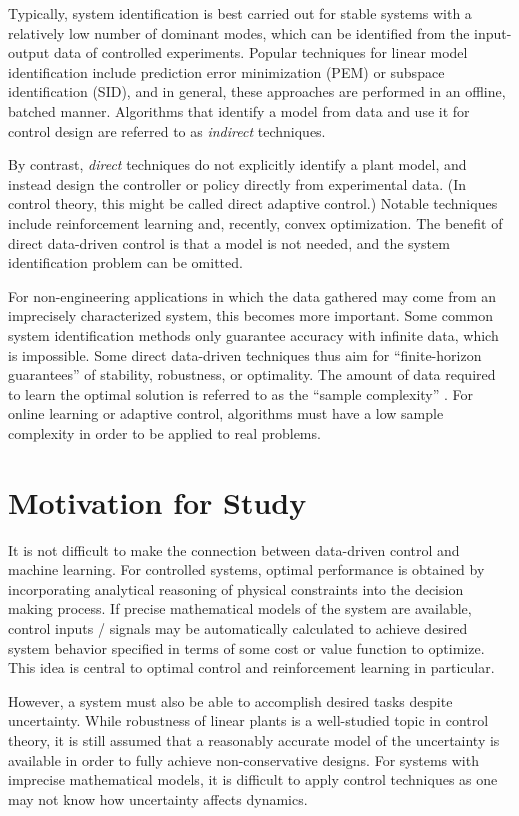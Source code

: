 Typically, system identification is best carried out for stable systems with a relatively low number of dominant modes, which can be identified from the input-output data of controlled experiments.  Popular techniques for linear model identification include prediction error minimization (PEM) or subspace identification (SID), and in general, these approaches are performed in an offline, batched manner.  Algorithms that identify a model from data and use it for control design are referred to as \emph{indirect} techniques.

By contrast, \emph{direct} techniques do not explicitly identify a plant model, and instead design the controller or policy directly from experimental data.  (In control theory, this might be called direct adaptive control.)  Notable techniques include reinforcement learning and, recently, convex optimization.  The benefit of direct data-driven control is that a model is not needed, and the system identification problem can be omitted.

For non-engineering applications in which the data gathered may come from an imprecisely characterized system, this becomes more important.  Some common system identification methods only guarantee accuracy with infinite data, which is impossible.  Some direct data-driven techniques thus aim for ``finite-horizon guarantees'' of stability, robustness, or optimality.  The amount of data required to learn the optimal solution is referred to as the ``sample complexity'' \cite{jedra2019sample, dean2020sample, zhang2021derivative}.  For online learning or adaptive control, algorithms must have a low sample complexity in order to be applied to real problems.

\section{Motivation for Study}
\label{chap:introMotivationForStudy}
It is not difficult to make the connection between data-driven control and machine learning.  For controlled systems, optimal performance is obtained by incorporating analytical reasoning of physical constraints into the decision making process.  If precise mathematical models of the system are available, control inputs / signals may be automatically calculated to achieve desired system behavior specified in terms of some cost or value function to optimize.  This idea is central to optimal control and reinforcement learning in particular.

However, a system must also be able to accomplish desired tasks despite uncertainty.  While robustness of linear plants is a well-studied topic in control theory, it is still assumed that a reasonably accurate model of the uncertainty is available in order to fully achieve non-conservative designs.  For systems with imprecise mathematical models, it is difficult to apply control techniques as one may not know how uncertainty affects dynamics.

